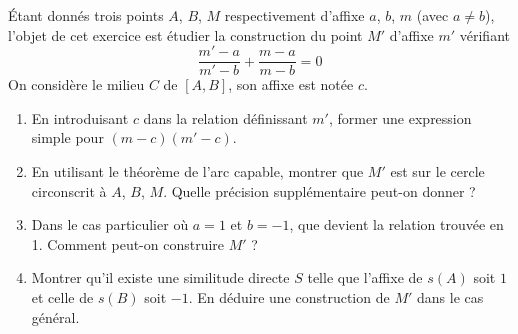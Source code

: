 \'Etant donnés trois points $A$, $B$, $M$ respectivement d'affixe $a$, $b$, $m$ (avec $a\neq b$), l'objet de cet exercice est étudier la construction du point $M'$ d'affixe $m'$ vérifiant
\begin{displaymath}
 \frac{m'-a}{m'-b} + \frac{m-a}{m-b} = 0
\end{displaymath}
On considère le milieu $C$ de $[A,B]$, son affixe est notée $c$.
\begin{enumerate}
 \item En introduisant $c$ dans la relation définissant $m'$, former une expression simple pour $(m-c)(m'-c)$.
 \item En utilisant le théorème de l'arc capable, montrer que $M'$ est sur le cercle circonscrit à $A$, $B$, $M$. Quelle précision supplémentaire peut-on donner ?
 \item Dans le cas particulier où $a=1$ et $b=-1$, que devient la relation trouvée en 1. Comment peut-on construire $M'$ ?
 \item Montrer qu'il existe une similitude directe $S$ telle que l'affixe de $s(A)$ soit $1$ et celle de $s(B)$ soit $-1$. En déduire une construction de $M'$ dans le cas général.
\end{enumerate}
